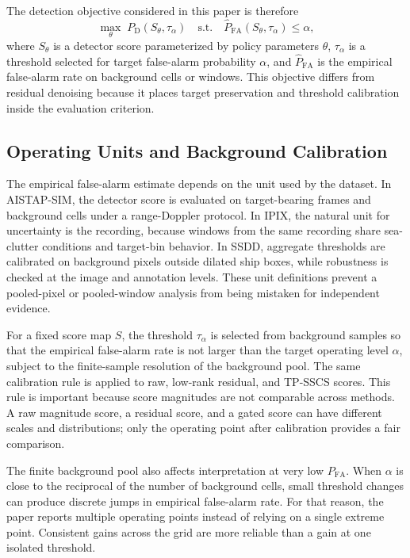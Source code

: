 \documentclass[journal]{IEEEtran}
\begin{document}
The detection objective considered in this paper is therefore
\begin{equation}
    \max_{\theta} \; P_{\mathrm{D}}(S_\theta, \tau_\alpha)
    \quad \mathrm{s.t.} \quad
    \widehat{P}_{\mathrm{FA}}(S_\theta, \tau_\alpha) \leq \alpha ,
\end{equation}
where $S_\theta$ is a detector score parameterized by policy parameters $\theta$, $\tau_\alpha$ is a threshold selected for target false-alarm probability $\alpha$, and $\widehat{P}_{\mathrm{FA}}$ is the empirical false-alarm rate on background cells or windows. This objective differs from residual denoising because it places target preservation and threshold calibration inside the evaluation criterion.

\subsection{Operating Units and Background Calibration}

The empirical false-alarm estimate depends on the unit used by the dataset. In AISTAP-SIM, the detector score is evaluated on target-bearing frames and background cells under a range-Doppler protocol. In IPIX, the natural unit for uncertainty is the recording, because windows from the same recording share sea-clutter conditions and target-bin behavior. In SSDD, aggregate thresholds are calibrated on background pixels outside dilated ship boxes, while robustness is checked at the image and annotation levels. These unit definitions prevent a pooled-pixel or pooled-window analysis from being mistaken for independent evidence.

For a fixed score map $S$, the threshold $\tau_\alpha$ is selected from background samples so that the empirical false-alarm rate is not larger than the target operating level $\alpha$, subject to the finite-sample resolution of the background pool. The same calibration rule is applied to raw, low-rank residual, and TP-SSCS scores. This rule is important because score magnitudes are not comparable across methods. A raw magnitude score, a residual score, and a gated score can have different scales and distributions; only the operating point after calibration provides a fair comparison.

The finite background pool also affects interpretation at very low $P_{\mathrm{FA}}$. When $\alpha$ is close to the reciprocal of the number of background cells, small threshold changes can produce discrete jumps in empirical false-alarm rate. For that reason, the paper reports multiple operating points instead of relying on a single extreme point. Consistent gains across the grid are more reliable than a gain at one isolated threshold.
\end{document}
